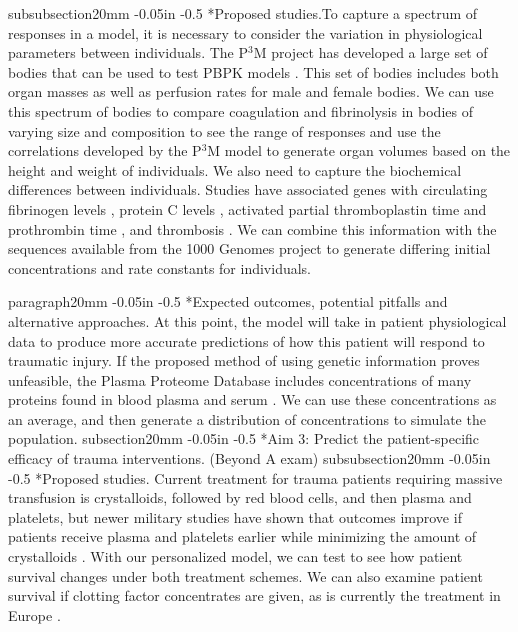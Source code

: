 \documentclass[11pt]{article}
\makeatletter
\renewcommand\subsection{\@startsection
	{subsection}{2}{0mm}
	{-0.05in}
	{-0.5\baselineskip}
	{\normalfont\normalsize\bfseries}}
\renewcommand\subsubsection{\@startsection
	{subsubsection}{2}{0mm}
	{-0.05in}
	{-0.5\baselineskip}
	{\normalfont\normalsize\bfseries}}
\renewcommand\paragraph{\@startsection
  {paragraph}{2}{0mm}
  {-0.05in}
  {-0.5\baselineskip}
  {\normalfont\normalsize\itshape}}
\makeatother
\begin{document}
\subsubsection*{Proposed studies.}To capture a spectrum of responses in a model, it is necessary to consider the variation in physiological parameters between individuals. The P$^3$M project has developed a large set of bodies that can be used to test PBPK models \citep{price2003modeling}. This set of bodies includes both organ masses as well as perfusion rates for male and female bodies. We can use this spectrum of bodies to compare coagulation and fibrinolysis in bodies of varying size and composition to see the range of responses and use the correlations developed by the P$^3$M model to generate organ volumes based on the height and weight of individuals.
We also need to capture the biochemical differences between individuals. Studies have associated genes with circulating fibrinogen levels \cite{dehghan2009association}, protein C levels \cite{russell2003genetics}, activated partial thromboplastin time and prothrombin time \cite{tang2012genetic}, and thrombosis \cite{lane1996inherited}. We can combine this information with the sequences available from the 1000 Genomes project to generate differing initial concentrations and rate constants for individuals. 

\paragraph*{Expected outcomes, potential pitfalls and alternative approaches.} At this point, the model will take in patient physiological data to produce more accurate predictions of how this patient will respond to traumatic injury.  
If the proposed method of using genetic information proves unfeasible, the Plasma Proteome Database includes concentrations of many proteins found in blood plasma and serum \cite{nanjappa2013plasma}. We can use these concentrations as an average, and then generate a distribution of concentrations to simulate the population.
\subsection*{Aim 3: Predict the patient-specific efficacy of trauma interventions. (Beyond A exam)}
\subsubsection*{Proposed studies.}
Current treatment for trauma patients requiring massive transfusion is crystalloids, followed by red blood cells, and then plasma and platelets, but newer military studies have shown that outcomes improve if patients receive plasma and platelets earlier while minimizing the amount of crystalloids \cite{holcomb2008increased}. With our personalized model, we can test to see how patient survival changes under both treatment schemes. We can also examine patient survival if clotting factor concentrates are given, as is currently the treatment in Europe \citep{hunt2014bleeding}.
\end{document}
